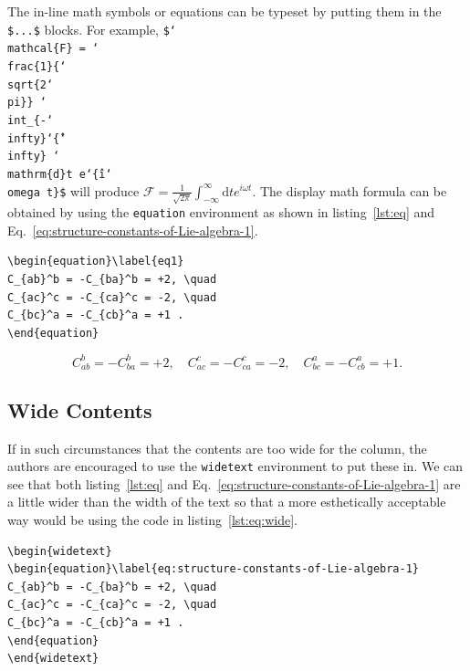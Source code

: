 \documentclass[submitting]{nst}
\begin{document}
The in-line math symbols or equations can be typeset by putting them in the \verb|$...$| blocks. For example, \texttt{\$\char`\\mathcal\{F\} = \char`\\frac\{1\}\{\char`\\sqrt\{2\char`\\pi\}\} \char`\\int\_\{-\char`\\infty\}\char`\^\{\char`\\infty\} \char`\\mathrm\{d\}t e\char`\^\{i\char`\\omega t\}\$} will produce $\mathcal{F} = \frac{1}{\sqrt{2\pi}} \int_{-\infty}^{\infty} \mathrm{d}t e^{i\omega t}$. The display math formula can be obtained by using the \verb|equation| environment as shown in listing~\ref{lst:eq} and Eq.~\eqref{eq:structure-constants-of-Lie-algebra-1}.

\begin{lstlisting}[caption={Source code of Equation~\eqref{eq:structure-constants-of-Lie-algebra-1}},label=lst:eq]
\begin{equation}\label{eq1}
C_{ab}^b = -C_{ba}^b = +2, \quad
C_{ac}^c = -C_{ca}^c = -2, \quad
C_{bc}^a = -C_{cb}^a = +1 .
\end{equation}
\end{lstlisting}

\begin{equation}\label{eq:structure-constants-of-Lie-algebra-1}
C_{ab}^b = -C_{ba}^b = +2, \quad C_{ac}^c = -C_{ca}^c = -2, \quad C_{bc}^a = -C_{cb}^a = +1 .
\end{equation}


\subsection{Wide Contents}

If in such circumstances that the contents are too wide for the column, the authors are encouraged to use the \verb|widetext| environment to put these in. We can see that both listing~\ref{lst:eq} and Eq.~\eqref{eq:structure-constants-of-Lie-algebra-1} are a little wider than the width of the text so that a more esthetically acceptable way would be using the code in listing~\ref{lst:eq:wide}. 

\begin{widetext}
\begin{lstlisting}[caption={Source code of Equation~\eqref{eq:structure-constants-of-Lie-algebra-1:widetext}},label=lst:eq:wide]
\begin{widetext}
\begin{equation}\label{eq:structure-constants-of-Lie-algebra-1}
C_{ab}^b = -C_{ba}^b = +2, \quad
C_{ac}^c = -C_{ca}^c = -2, \quad
C_{bc}^a = -C_{cb}^a = +1 .
\end{equation}
\end{widetext}
\end{lstlisting}
\end{widetext}
\end{document}
